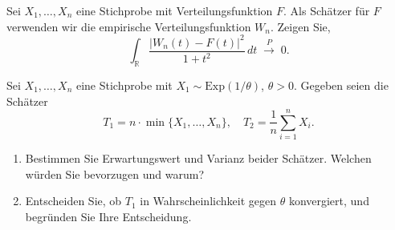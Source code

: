\begin{aufgabe}
Sei \(X_1,\dots,X_n\) eine Stichprobe mit Verteilungsfunktion \(F\). Als Schätzer für \(F\) verwenden wir die empirische Verteilungsfunktion \(W_n\). Zeigen Sie,
\[
  \int_{\mathbb{R}}
  \frac{\bigl|W_n(t) - F(t)\bigr|^2}{1 + t^2}\,dt
  \;\xrightarrow{P}\;0.
\]
\end{aufgabe}

\begin{aufgabe}
Sei \(X_1,\dots,X_n\) eine Stichprobe mit \(X_1\sim\mathrm{Exp}(1/\theta)\), \(\theta>0\). Gegeben seien die Schätzer
\[
  T_1 = n\cdot \min\{X_1,\dots,X_n\},
  \quad
  T_2 = \frac{1}{n}\sum_{i=1}^n X_i.
\]
\begin{enumerate}
  \item Bestimmen Sie Erwartungswert und Varianz beider Schätzer. Welchen würden Sie bevorzugen und warum?
  \item Entscheiden Sie, ob \(T_1\) in Wahrscheinlichkeit gegen \(\theta\) konvergiert, und begründen Sie Ihre Entscheidung.
\end{enumerate}
\end{aufgabe}

